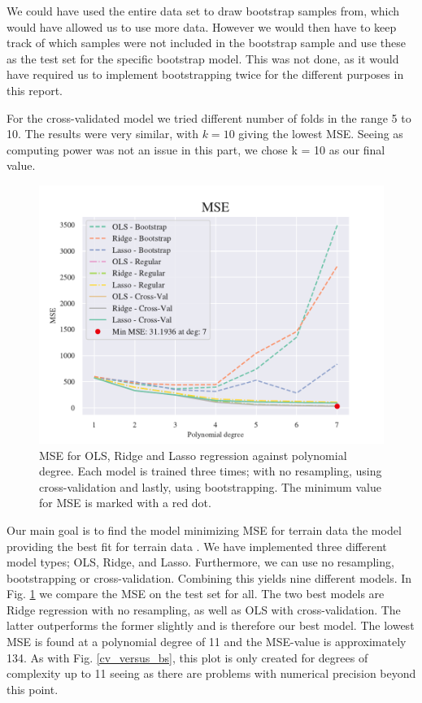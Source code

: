  
We could have used the entire data set to draw bootstrap samples from, which would have allowed us to use more data.
However we would then have to keep track of which samples were not included in the bootstrap sample and use these as the test set for the specific bootstrap model. 
This was not done, as it would have required us to implement bootstrapping twice for the different purposes in this report.

For the cross-validated model we tried different number of folds in the range 5 to 10. 
The results were very similar, with $k = 10$ giving the lowest MSE. 
Seeing as computing power was not an issue in this part, we chose k = 10 as our final value. 

\begin{figure}[h!]
    \centering
    \includegraphics[width=1\linewidth]{project_1/figures/figures_in_report/All_terrain.pdf}
    \caption{MSE for OLS, Ridge and Lasso regression against polynomial degree. Each model is trained three times; with no resampling, using cross-validation and lastly, using bootstrapping. The minimum value for MSE is marked with a red dot.}
    \label{all_terrain}
\end{figure}

Our main goal is to find the model minimizing MSE for terrain data  the model providing the best fit for terrain data . We have implemented three different model types; OLS, Ridge, and Lasso. Furthermore, we can use no resampling, bootstrapping or cross-validation. Combining this yields nine different models. In Fig. \ref{all_terrain} we compare the MSE on the test set for all. The two best models are Ridge regression with no resampling, as well as OLS with cross-validation. The latter outperforms the former slightly and is therefore our best model. The lowest MSE is found at a polynomial degree of 11 and the MSE-value is approximately 134. As with Fig. \ref{cv_versus_bs}, this plot is only created for degrees of complexity up to 11 seeing as there are problems with numerical precision beyond this point. 

